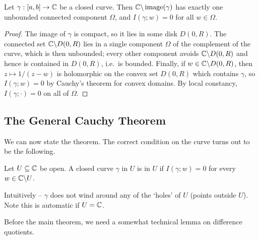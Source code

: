 \documentclass[a4paper]{scrartcl}
\begin{document}
\begin{proposition}
    Let $\gamma: [a, b] \rightarrow \mathbb{C}$ be a closed curve. Then $\mathbb{C} \backslash \operatorname{image}(\gamma)$ has exactly one unbounded connected component $\Omega$, and $I(\gamma; w) = 0$ for all $w \in \Omega$.
\end{proposition}
\begin{proof}
    The image of $\gamma$ is compact, so it lies in some disk $D(0, R)$. The connected set $\mathbb{C} \backslash D(0, R)$ lies in a single component $\Omega$ of the complement of the curve, which is then unbounded; every other component avoids $\mathbb{C} \backslash D(0, R)$ and hence is contained in $D(0, R)$, i.e.\ is bounded. Finally, if $w \in \mathbb{C} \backslash D(0, R)$, then $z \mapsto 1/(z - w)$ is holomorphic on the convex set $D(0, R)$ which contains $\gamma$, so $I(\gamma; w) = 0$ by Cauchy's theorem for convex domains. By local constancy, $I(\gamma; \cdot) = 0$ on all of $\Omega$.
\end{proof}

\subsection{The General Cauchy Theorem}

We can now state the theorem. The correct condition on the curve turns out to be the following.

\begin{definition}
    Let $U \subseteq \mathbb{C}$ be open. A closed curve $\gamma$ in $U$ is  in $U$ if $I(\gamma; w) = 0$ for every $w \in \mathbb{C} \backslash U$.
\end{definition}

Intuitively -- $\gamma$ does not wind around any of the `holes' of $U$ (points outside $U$). Note this is automatic if $U = \mathbb{C}$.

Before the main theorem, we need a somewhat technical lemma on difference quotients.
\end{document}
